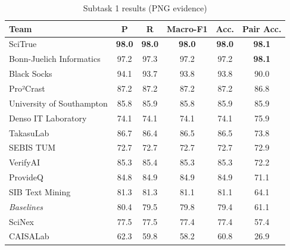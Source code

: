 \begin{table}[ht]
\centering
\small
\caption{Subtask 1 results (PNG evidence)}
\label{tab:subtask1_png}
\begin{tabular}{lccccc}
\toprule
Team & P & R & Macro-F1 & Acc. & Pair Acc. \\
\midrule
SciTrue & \textbf{98.0} & \textbf{98.0} & \textbf{98.0} & \textbf{98.0} & \textbf{98.1} \\
Bonn-Juelich Informatics & 97.2 & 97.3 & 97.2 & 97.2 & \textbf{98.1} \\
Black Socks & 94.1 & 93.7 & 93.8 & 93.8 & 90.0 \\
Pro²Crast & 87.2 & 87.2 & 87.2 & 87.2 & 86.8 \\
University of Southampton & 85.8 & 85.9 & 85.8 & 85.9 & 85.9 \\
Denso IT Laboratory & 74.1 & 74.1 & 74.1 & 74.1 & 75.9 \\
TakasuLab & 86.7 & 86.4 & 86.5 & 86.5 & 73.8 \\
SEBIS TUM & 72.7 & 72.7 & 72.7 & 72.7 & 72.9 \\
VerifyAI & 85.3 & 85.4 & 85.3 & 85.3 & 72.2 \\
ProvideQ & 84.8 & 84.9 & 84.9 & 84.9 & 71.1 \\
SIB Text Mining & 81.3 & 81.3 & 81.1 & 81.1 & 64.1 \\
\textit{Baselines} & 80.4 & 79.5 & 79.8 & 79.4 & 61.1 \\
SciNex & 77.5 & 77.5 & 77.4 & 77.4 & 57.4 \\
CAISALab & 62.3 & 59.8 & 58.2 & 60.8 & 26.9 \\
\bottomrule
\end{tabular}
\end{table}
